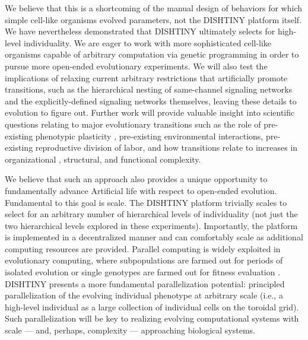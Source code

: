 We believe that this is a shortcoming of the manual design of behaviors for which simple cell-like organisms evolved parameters, not the DISHTINY platform itself.
We have nevertheless demonstrated that DISHTINY ultimately selects for high-level individuality.
We are eager to work with more sophisticated cell-like organisms capable of arbitrary computation via genetic programming in order to pursue more open-ended evolutionary experiments.
We will also test the implications of relaxing current arbitrary restrictions that artificially promote transitions, such as the hierarchical nesting of same-channel signaling networks and the explicitly-defined signaling networks themselves, leaving these details to evolution to figure out.
Further work will provide valuable insight into scientific questions relating to major evolutionary transitions such as the role of pre-existing phenotypic plasticity \citep{clune2007investigating, lalejini2016evolutionary}, pre-existing environmental interactions, pre-existing reproductive division of labor, and how transitions relate to increases in organizational \citep{goldsby2012task}, structural, and functional \citep{goldsby2014evolutionary} complexity.

We believe that such an approach also provides a unique opportunity to fundamentally advance Artificial life with respect to open-ended evolution.
Fundamental to this goal is scale.
The DISHTINY platform trivially scales to select for an arbitrary number of hierarchical levels of individuality (not just the two hierarchical levels explored in these experiments).
Importantly, the platform is implemented in a decentralized manner and can comfortably scale as additional computing resources are provided.
Parallel computing is widely exploited in evolutionary computing, where subpopulations are farmed out for periods of isolated evolution or single genotypes are farmed out for fitness evaluation
\citep{lin1994coarse, real17a}.
DISHTINY presents a more fundamental parallelization potential: principled parallelization of the evolving individual phenotype at arbitrary scale (i.e., a high-level individual as a large collection of individual cells on the toroidal grid).
Such parallelization will be key to realizing evolving computational systems with scale --- and, perhaps, complexity --- approaching biological systems.
